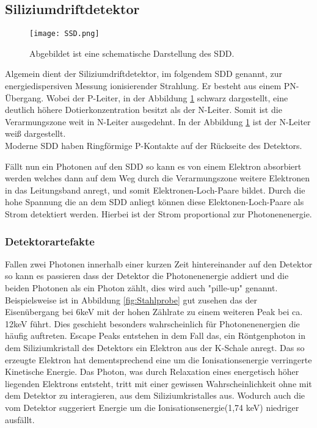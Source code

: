 \subsection{Siliziumdriftdetektor}
\begin{figure}[h]
 \centering
 \texttt{[image: SSD.png]}
 \caption[SDD]{Abgebildet ist eine schematische Darstellung des SDD. \cite{bib:SDD}}
 \label{fig:SDD}
\end{figure}
Algemein dient der Siliziumdriftdetektor, im folgendem SDD genannt, zur energiedispersiven Messung ionisierender Strahlung.
Er besteht aus einem PN-Übergang.
Wobei der P-Leiter, in der Abbildung \ref{fig:SDD} schwarz dargestellt,  eine deutlich höhere Dotierkonzentration besitzt als der N-Leiter. Somit ist die Verarmungszone weit in  N-Leiter ausgedehnt.
In der Abbildung \ref{fig:SDD} ist der N-Leiter weiß dargestellt.\\
Moderne SDD haben Ringförmige P-Kontakte auf der Rückseite des Detektors. 

Fällt nun ein Photonen auf den SDD so kann es von einem Elektron absorbiert werden welches dann auf dem Weg durch die Verarmungszone weitere Elektronen in das Leitungsband anregt, und somit Elektronen-Loch-Paare bildet.
Durch die hohe Spannung die an dem SDD anliegt können diese Elektonen-Loch-Paare als Strom detektiert werden. Hierbei ist der Strom proportional zur Photonenenergie. \\
\subsubsection{Detektorartefakte }
Fallen zwei Photonen innerhalb einer kurzen Zeit hintereinander auf den Detektor so kann es passieren dass der Detektor die Photonenenergie addiert und die beiden Photonen als ein Photon zählt, dies wird auch "pille-up" genannt. Beispielsweise ist in Abbildung \ref{fig:Stahlprobe} gut zusehen das der Eisenübergang bei 6keV mit der hohen Zählrate zu einem weiteren Peak bei ca. 12keV führt.
Dies geschieht besonders wahrscheinlich für Photonenenergien die häufig auftreten. 
Escape Peaks entstehen in dem Fall das, ein Röntgenphoton in dem Siliziumkristall des Detektors ein Elektron aus der K-Schale anregt. Das so erzeugte Elektron hat dementsprechend eine um die Ionisationsenergie verringerte Kinetische Energie. 
Das Photon, was durch Relaxation eines energetisch höher liegenden Elektrons entsteht, tritt mit einer gewissen Wahrscheinlichkeit ohne mit dem Detektor zu interagieren, aus dem Siliziumkristalles aus. 
Wodurch auch die vom Detektor suggeriert Energie um die Ionisationsenergie(1,74 keV) niedriger ausfällt.
